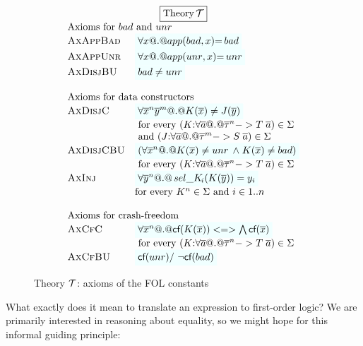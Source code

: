 \begin{figure}\small
\setlength{\arraycolsep}{1pt}
\[\begin{array}{c}
\ruleform{\text{Theory}\,\Th} \\
\begin{array}{ll}
\multicolumn{2}{l}{\text{Axioms for $bad$ and $unr$}} \\
 \textsc{AxAppBad}  & \formula{\forall x @.@ app(\bad,x){=}\bad}  \\
 \textsc{AxAppUnr}  & \formula{\forall x @.@ app(\unr,x){=}\unr}    \\
 \textsc{AxDisjBU} & \formula{\bad \neq \unr}  \\
\\
\multicolumn{2}{l}{\mbox{Axioms for data constructors}} \\
 \textsc{AxDisjC} & \formula{\forall \oln{x}{n}\oln{y}{m} @.@ K(\ol{x}) \neq J(\ol{y})} \\
                  & \text{ for every } (K{:}\forall\as @.@ \oln{\tau}{n} -> T\;\as) \in \Sigma \\
                  & \text{ and } (J{:}\forall\as @.@ \oln{\tau}{m} -> S\;\as) \in \Sigma \\
 \textsc{AxDisjCBU} & \formula{(\forall \oln{x}{n} @.@ K(\ol{x}) \neq \unr \; \land \; K(\ol{x}) \neq \bad)} \\
                  & \text{ for every } (K{:}\forall\as @.@ \oln{\tau}{n} -> T\;\as) \in \Sigma \\
 \textsc{AxInj}   & \formula{\forall \oln{y}{n} @.@ \sel{K}{i}(K(\ys)) = y_i} \\
                  & \text{for every } K^\ar \in \Sigma \text{ and } i \in 1..n \\
\\
\multicolumn{2}{l}{\mbox{Axioms for crash-freedom}} \\
 \textsc{AxCfC}  & \formula{\forall \oln{x}{n} @.@ \lcf{K(\ol{x})} <=> \bigwedge\lcf{\ol{x}}} \\
                 & \text{ for every } (K{:}\forall\as @.@ \oln{\tau}{n} -> T\;\as) \in \Sigma \\
 \textsc{AxCfBU} & \formula{\lcf{\unr} /\ \lncf{\bad}} \\
\end{array}
\end{array}\]
\caption{Theory ${\cal T}$: axioms of the FOL constants}\label{fig:prelude} \label{fig:data-cons}
\end{figure}

What exactly does it mean to translate an expression to first-order logic?
We are primarily interested in reasoning about equality, so we might
hope for this informal guiding principle:

